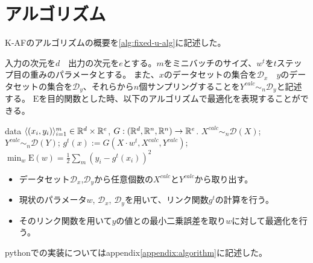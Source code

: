 \section{アルゴリズム}
K-AFのアルゴリズムの概要を\ref{alg:fixed-u-alg}に記述した。

入力の次元を$ d $　出力の次元を$ e $とする。$ m $をミニバッチのサイズ、$ w^t $を$t$ステップ目の重みのパラメータとする。
また、$x$のデータセットの集合を$ \mathcal{D}_x $　$y$のデータセットの集合を$ \mathcal{D}_y $、それらから$n$個サンプリングすることを$ Y^{calc} \sim_n \mathcal{D}_y $と記述する。
$ \mathrm{E} $を目的関数とした時、以下のアルゴリズムで最適化を表現することができる。



\begin{algorithm}[]
	\caption{\KAF}
	\label{alg:fixed-u-alg}
\begin{algorithmic}
	 data $\langle (x_i, y_i) \rangle_{i=1}^m \in
	\mathbb{R}^d \times \mathbb{R}^e$, $G: ( \mathbb{R}^d, \mathbb{R}^n, \mathbb{R}^n ) \rightarrow  \mathbb{R}^e$.
	\STATE $X^{calc} \sim_n \mathcal{D}(X)$;
    \STATE $Y^{calc} \sim_n \mathcal{D}(Y)$;
	\STATE $g^t(x) := G(X \cdot w^t, X^{calc}, Y^{calc} )$;
	\STATE $ \displaystyle{\min_{w} \mathrm{E}(w)} = \frac{1}{2}\sum_m (y_i - g^t(x_i))^2 $
	\ENDFOR
\end{algorithmic}
\end{algorithm}

\begin{itemize}
  \item データセット$\mathcal{D}_x$,$\mathcal{D}_y$から任意個数の$ X^{calc} $と$ Y^{calc} $から取り出す。
  \item 現状のパラメータ$ w $, $\mathcal{D}_x$, $\mathcal{D}_y$を用いて、リンク関数$ g^t $の計算を行う。
  \item そのリンク関数を用いて$ y $の値との最小二乗誤差を取り$ w $に対して最適化を行う。
\end{itemize}


pythonでの実装についてはappendix\ref{appendix:algorithm}に記述した。







